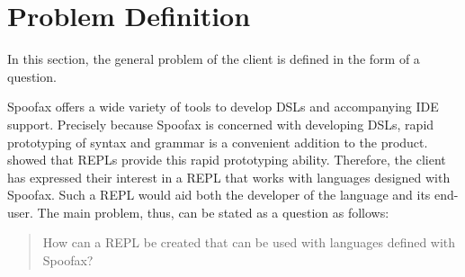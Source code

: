 \section{Problem Definition}
\label{sec:problem-definition}

In this section, the general problem of the client is defined in the
form of a question.

Spoofax offers a wide variety of tools to develop DSLs and accompanying IDE
support. Precisely because Spoofax is concerned with developing DSLs, rapid
prototyping of syntax and grammar is a convenient addition to the product.
 showed that REPLs provide this rapid prototyping
ability.  Therefore, the client has expressed their interest in a REPL that
works with languages designed with Spoofax. Such a REPL would aid both the
developer of the language and its end-user. The main problem, thus, can be
stated as a question as follows:

\begin{quote}
  How can a REPL be created that can be used with languages defined
  with Spoofax?
\end{quote}

